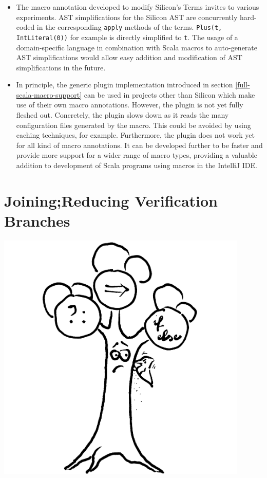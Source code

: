 \documentclass[11pt]{article}
\begin{document}
    \begin{itemize}
        \item The macro annotation developed to modify Silicon's Terms
            invites to various experiments. AST simplifications
            for the Silicon AST are concurrently hard-coded in the corresponding \texttt{apply}
            methods of the terms. \texttt{Plus(t, IntLiteral(0))} for example is directly
            simplified to \texttt{t}.
            The usage of a domain-specific language in combination with Scala macros to
            auto-generate AST
            simplifications would allow easy addition and modification
            of AST simplifications in the future. 
        \item In principle, the generic plugin implementation introduced in
            section \ref{full-scala-macro-support} can be used in projects other
            than Silicon which make use of their own macro annotations.
            However, the plugin is not yet fully fleshed out. Concretely,
            the plugin slows down as it reads the many configuration 
            files generated by the macro. This could be avoided by
            using caching techniques, for example. 
            Furthermore, the plugin does not work yet for
            all kind of macro annotations.
            It can be developed
            further to be faster and provide more support for a
            wider range of macro types, providing a valuable addition to
            development of Scala programs using macros in the IntelliJ IDE.
    \end{itemize}

    \newpage
    \part{Joining;\newline Reducing Verification Branches} \label{part-2}
    \begin{center}
        \vspace{2cm}
        \includegraphics[width=0.9\textwidth]{tree}
    \end{center}
\end{document}
